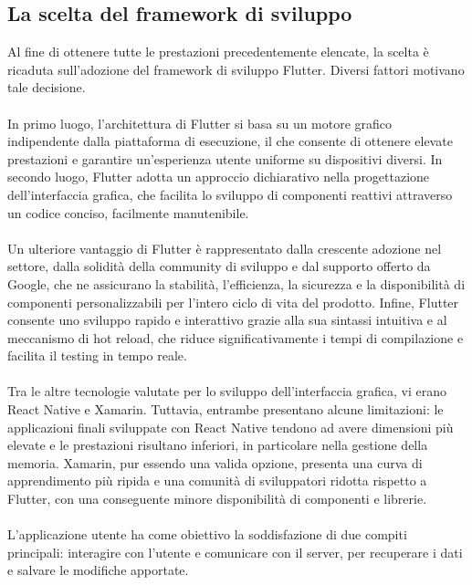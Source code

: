 \subsection{La scelta del framework di sviluppo}
Al fine di ottenere tutte le prestazioni precedentemente elencate, 
la scelta è ricaduta sull’adozione del framework di sviluppo Flutter.
Diversi fattori motivano tale decisione. \\
\\
In primo luogo, l'architettura di Flutter si basa su un motore grafico indipendente dalla piattaforma di esecuzione,
il che consente di ottenere elevate prestazioni e 
garantire un'esperienza utente uniforme su dispositivi diversi.
In secondo luogo, Flutter adotta un approccio dichiarativo nella progettazione dell'interfaccia grafica,
che facilita lo sviluppo di componenti reattivi attraverso un codice conciso, facilmente manutenibile.\\
\\
Un ulteriore vantaggio di Flutter è rappresentato dalla crescente adozione nel settore,
dalla solidità della community di sviluppo e dal supporto offerto da Google,
che ne assicurano la stabilità, l'efficienza, la sicurezza e la disponibilità 
di componenti personalizzabili per l'intero ciclo di vita del prodotto.
Infine, Flutter consente uno sviluppo rapido e interattivo grazie alla sua sintassi intuitiva e al meccanismo di hot reload,
che riduce significativamente i tempi di compilazione e facilita il testing in tempo reale.\\
\\
Tra le altre tecnologie valutate per lo sviluppo dell'interfaccia grafica, vi erano React Native e Xamarin.
Tuttavia, entrambe presentano alcune limitazioni: 
le applicazioni finali sviluppate con React Native tendono ad avere dimensioni più elevate e le prestazioni risultano inferiori,
in particolare nella gestione della memoria.
Xamarin, pur essendo una valida opzione, presenta una curva di apprendimento più ripida e 
una comunità di sviluppatori ridotta rispetto a Flutter,
con una conseguente minore disponibilità di componenti e librerie.\\
\\
L'applicazione utente ha come obiettivo la soddisfazione di due compiti principali: interagire con l'utente e 
comunicare con il server, per recuperare i dati e salvare le modifiche apportate.\\
\\

